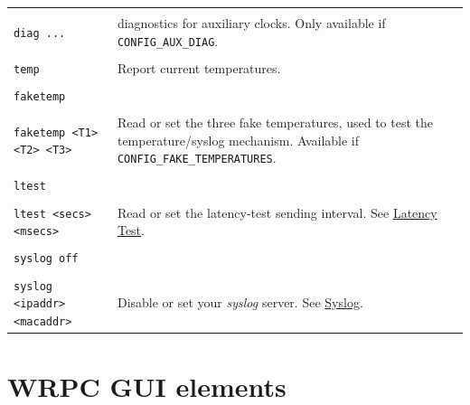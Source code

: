 \documentclass[a4paper, 12pt]{article}
\newcommand{\code}[1]{\texttt{#1}}
\newcommand{\link}[1]{\hyperref[#1]{#1}}
\begin{document}
\begin{longtable}{  p{8cm}  p{6cm} }
 & \\
  \code{diag ...} & diagnostics for auxiliary clocks. Only available if \texttt{CONFIG\_AUX\_DIAG}.\\
 & \\
  \code{temp} & Report current temperatures.\\
 & \\
  \code{faketemp} & \\
 & \\
  \code{faketemp <T1> <T2> <T3>}  & Read or set the three fake temperatures, used to test the temperature/syslog mechanism. Available if \texttt{CONFIG\_FAKE\_TEMPERATURES}.\\
 & \\
  \code{ltest} & \\
 & \\
  \code{ltest <secs> <msecs>} & Read or set the latency-test sending interval. See \link{Latency Test}.\\
 & \\
  \code{syslog off} & \\
 & \\
  \code{syslog <ipaddr> <macaddr>} & Disable or set your \textit{syslog} server. See \link{Syslog}.\\

\end{longtable}



\clearpage
\label{WRPC GUI elements}
\section{WRPC GUI elements}
\end{document}
